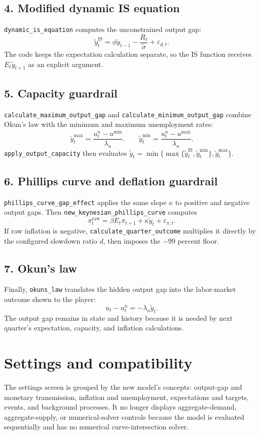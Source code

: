 \documentclass[11pt]{article}
\newcommand{\code}[1]{\texttt{#1}}
\newcommand{\gap}{\widetilde y}
\begin{document}
\subsection*{4. Modified dynamic IS equation}
\code{dynamic\_is\_equation} computes the unconstrained output gap:
\[
 \gap_t^{\mathrm{IS}}
 =\phi\gap_{t-1}-\frac{R_t}{\widetilde\sigma}+\varepsilon_{d,t}.
\]
The code keeps the expectation calculation separate, so the IS function
receives $E_t\gap_{t+1}$ as an explicit argument.

\subsection*{5. Capacity guardrail}
\code{calculate\_maximum\_output\_gap} and
\code{calculate\_minimum\_output\_gap} combine Okun's law with the minimum and
maximum unemployment rates:
\[
 \gap_t^{\max}=\frac{u_t^n-u^{\min}}{\lambda_u}.
 \qquad
 \gap_t^{\min}=\frac{u_t^n-u^{\max}}{\lambda_u}.
\]
\code{apply\_output\_capacity} then evaluates
$\gap_t=\min\{\max\{\gap_t^{\mathrm{IS}},\gap_t^{\min}\},\gap_t^{\max}\}$.

\subsection*{6. Phillips curve and deflation guardrail}
\code{phillips\_curve\_gap\_effect} applies the same slope $\kappa$ to positive
and negative output gaps. Then
\code{new\_keynesian\_phillips\_curve} computes
\[
 \pi_t^{\mathrm{raw}}
 =\beta E_t\pi_{t+1}+\kappa\gap_t+\varepsilon_{\pi,t}.
\]
If raw inflation is negative, \code{calculate\_quarter\_outcome} multiplies it
directly by the configured slowdown ratio $d$, then imposes the $-99$ percent
floor.

\subsection*{7. Okun's law}
Finally, \code{okuns\_law} translates the hidden output gap into the labor-market
outcome shown to the player:
\[
 u_t-u_t^n=-\lambda_u\gap_t.
\]
The output gap remains in state and history because it is needed by next
quarter's expectation, capacity, and inflation calculations.

\section{Settings and compatibility}

The settings screen is grouped by the new model's concepts: output-gap and
monetary transmission, inflation and unemployment, expectations and targets,
events, and background processes.  It no longer displays aggregate-demand,
aggregate-supply, or numerical-solver controls because the model is evaluated
sequentially and has no numerical curve-intersection solver.
\end{document}

